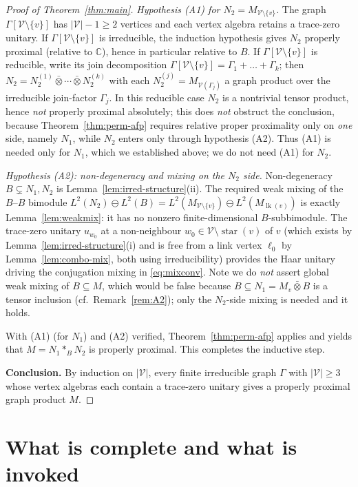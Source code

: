 \documentclass[11pt]{article}
\DeclareMathOperator{\link}{lk}
\DeclareMathOperator{\str}{star}
\newcommand{\Gra}{\Gamma}
\newcommand{\VV}{\mathcal V}
\newcommand{\abs}[1]{\lvert #1\rvert}
\newcommand{\set}[1]{\{#1\}}
\begin{document}
\begin{proof}[Proof of Theorem~\ref{thm:main}]
\emph{Hypothesis (A1) for $N_2=M_{\VV\setminus\set v}$.} The graph $\Gra[\VV\setminus\set v]$ has
$\abs{\VV}-1\ge2$ vertices and each vertex algebra retains a trace-zero unitary. If
$\Gra[\VV\setminus\set v]$ is irreducible, the induction hypothesis gives $N_2$ properly proximal (relative
to $\mathbb C$), hence in particular relative to $B$. If $\Gra[\VV\setminus\set v]$ is reducible, write its
join decomposition $\Gra[\VV\setminus\set v]=\Gra_1+\dots+\Gra_k$; then
$N_2=N_2^{(1)}\bar\otimes\cdots\bar\otimes N_2^{(k)}$ with each $N_2^{(j)}=M_{\VV(\Gra_j)}$ a graph product
over the irreducible join-factor $\Gra_j$. In this reducible case $N_2$ is a nontrivial tensor product, hence
\emph{not} properly proximal absolutely; this does \emph{not} obstruct the conclusion, because
Theorem~\ref{thm:perm-afp} requires relative proper proximality only on \emph{one} side, namely $N_1$, while
$N_2$ enters only through hypothesis (A2). Thus (A1) is needed only for $N_1$, which we established above; we
do not need (A1) for $N_2$.

\emph{Hypothesis (A2): non-degeneracy and mixing on the $N_2$ side.} Non-degeneracy
$B\subsetneq N_1,N_2$ is Lemma~\ref{lem:irred-structure}(ii). The required weak mixing of the $B$--$B$
bimodule $L^2(N_2)\ominus L^2(B)=L^2(M_{\VV\setminus\set v})\ominus L^2(M_{\link(v)})$ is exactly
Lemma~\ref{lem:weakmix}: it has no nonzero finite-dimensional $B$-subbimodule. The trace-zero unitary
$u_{w_0}$ at a non-neighbour $w_0\in\VV\setminus\str(v)$ of $v$ (which exists by
Lemma~\ref{lem:irred-structure}(i) and is free from a link vertex $\ell_0$ by Lemma~\ref{lem:combo-mix},
both using irreducibility) provides the Haar unitary driving the conjugation mixing in \eqref{eq:mixconv}.
Note we do \emph{not} assert global weak mixing of $B\subseteq M$, which would be false because
$B\subseteq N_1=M_v\bar\otimes B$ is a tensor inclusion (cf.\ Remark~\ref{rem:A2}); only the $N_2$-side
mixing is needed and it holds.

With (A1) (for $N_1$) and (A2) verified, Theorem~\ref{thm:perm-afp} applies and yields that
$M=N_1*_B N_2$ is properly proximal. This completes the inductive step.

\textbf{Conclusion.} By induction on $\abs{\VV}$, every finite irreducible graph $\Gra$ with $\abs{\VV}\ge3$
whose vertex algebras each contain a trace-zero unitary gives a properly proximal graph product $M$.
\end{proof}

\section{What is complete and what is invoked}\label{sec:honest}
\end{document}
